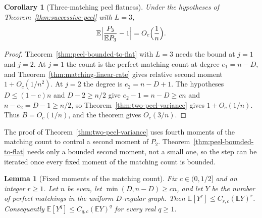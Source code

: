 \documentclass[11pt]{article}
\newtheorem{lemma}[theorem]{Lemma}
\newtheorem{corollary}[theorem]{Corollary}
\newcommand{\EE}{\mathbb{E}}
\begin{document}
\begin{corollary}[Three-matching peel flatness]
\label{cor:three-peel-flat}
Under the hypotheses of Theorem~\ref{thm:successive-peel} with \(L=3\),
\[
\EE\Bigl|\frac{P_3}{\EE P_3}-1\Bigr|=O_c\Bigl(\frac1n\Bigr).
\]
\end{corollary}

\begin{proof}
Theorem~\ref{thm:peel-bounded-to-flat} with \(L=3\) needs the bound at
\(j=1\) and \(j=2\).
At \(j=1\) the count is the perfect-matching count at degree \(e_1=n-D\), and
Theorem~\ref{thm:matching-linear-rate} gives relative second moment
\(1+O_c(1/n^2)\).
At \(j=2\) the degree is \(e_2=n-D+1\).
The hypotheses \(D\le(1-c)n\) and \(D-2\ge n/2\) give
\(e_2-1=n-D\ge cn\) and \(n-e_2=D-1\ge n/2\), so
Theorem~\ref{thm:two-peel-variance} gives \(1+O_c(1/n)\).
Thus \(B=O_c(1/n)\), and the theorem gives \(O_c(3/n)\).
\end{proof}

The proof of Theorem~\ref{thm:two-peel-variance} uses fourth moments of the
matching count to control a second moment of \(P_2\).
Theorem~\ref{thm:peel-bounded-to-flat} needs only a bounded second moment,
not a small one, so the step can be iterated once every fixed moment of the
matching count is bounded.

\begin{lemma}[Fixed moments of the matching count]
\label{lem:fixed-moments}
Fix \(c\in(0,1/2]\) and an integer \(r\ge 1\).
Let \(n\) be even, let \(\min(D,n-D)\ge cn\), and let \(Y\) be the number of
perfect matchings in the uniform \(D\)-regular graph.
Then \(\EE[Y^r]\le C_{r,c}(\EE Y)^r\).
Consequently \(\EE[Y^q]\le C_{q,c}(\EE Y)^q\) for every real \(q\ge 1\).
\end{lemma}
\end{document}
